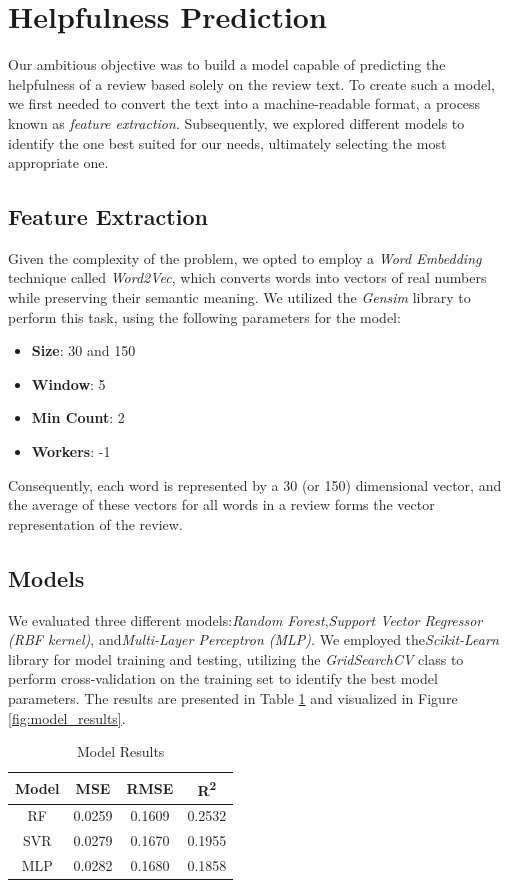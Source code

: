 \section{Helpfulness Prediction}
Our ambitious objective was to build a model capable of predicting the helpfulness of a review based solely on the review text.
To create such a model, we first needed to convert the text into a machine-readable format, a process known as \textit{feature extraction}.
Subsequently, we explored different models to identify the one best suited for our needs, ultimately selecting the most appropriate one.

\subsection*{Feature Extraction}
Given the complexity of the problem, we opted to employ a \textit{Word Embedding} technique called \textit{Word2Vec}, which converts words into
vectors of real numbers while preserving their semantic meaning. We utilized the \textit{Gensim} library to perform this task, using the
following parameters for the model:
\begin{itemize}[noitemsep, leftmargin=*]
    \item \textbf{Size}: 30 and 150
    \item \textbf{Window}: 5
    \item \textbf{Min Count}: 2
    \item \textbf{Workers}: -1
\end{itemize}
Consequently, each word is represented by a 30 (or 150) dimensional vector, and the average of these vectors for all words in a review forms the vector
representation of the review.

\subsection*{Models}
We evaluated three different models:\textit{Random Forest},\textit{Support Vector Regressor (RBF kernel)}, and\textit{Multi-Layer Perceptron (MLP)}.
We employed the\textit{Scikit-Learn} library for model training and testing, utilizing the \textit{GridSearchCV} class to perform cross-validation on
the training set to identify the best model parameters. The results are presented in Table \ref{tab:model_results} and visualized in Figure
\ref{fig:model_results}.

\begin{table}[H]
    \footnotesize
    \centering
    \caption{Model Results}
    \label{tab:model_results}
    \begin{tabular}{|c|c|c|c|}
        \hline
        Model & MSE    & RMSE   & R\textsuperscript{2} \\
        \hline
        RF    & 0.0259 & 0.1609 & 0.2532               \\
        SVR   & 0.0279 & 0.1670 & 0.1955               \\
        MLP   & 0.0282 & 0.1680 & 0.1858               \\
        \hline
    \end{tabular}
\end{table}


